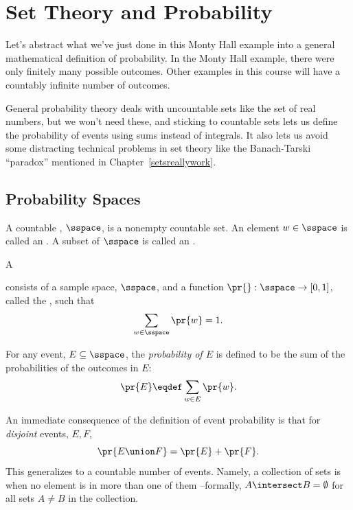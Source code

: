 

\section{Set Theory and Probability}

Let's abstract what we've just done in this Monty Hall example into a
general mathematical definition of probability.  In the Monty Hall
example, there were only finitely many possible outcomes.  Other examples
in this course will have a countably infinite number of outcomes.

General probability theory deals with uncountable sets like the set of
real numbers, but we won't need these, and sticking to countable sets lets
us define the probability of events using sums instead of integrals.  It
also lets us avoid some distracting technical problems in set theory like
the Banach-Tarski ``paradox'' mentioned in Chapter~\ref{setsreallywork}.

\subsection{Probability Spaces}

\begin{definition}\label{LN12:sampsp}
  A countable , $\sspace$, is a nonempty countable set.
  An element $w \in \sspace$ is called an .  A subset of
  $\sspace$ is called an .
\end{definition}

\begin{definition}\label{LN12:probsp}
  A  consists of a sample
  space, $\sspace$, and a function $\pr{}: \sspace\to [0,1]$, called
  the , such that
\[
\sum_{w \in \sspace} \pr{w} = 1.
\]

For any event, $E \subseteq \sspace$, the 
\emph{probability of $E$} is defined to be the sum of the probabilities of
the outcomes in $E$:
\[
\pr{E} \eqdef \sum_{w \in E} \pr{w}.
\]
\end{definition}

An immediate consequence of the definition of event probability is that
for \emph{disjoint} events, $E,F$,
\[
\pr{E \union F} = \pr{E} + \pr{F}.
\]
This generalizes to a countable number of events.  Namely, a collection of
sets is  when no element is in more than one of
them --formally, $A \intersect B = \emptyset$ for all sets $A \neq B$ in
the collection.


